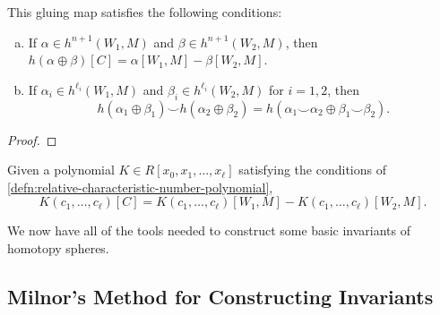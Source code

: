 \begin{proposition}\label{prop:invariant-variation-naturality}
This gluing map satisfies the following conditions:
\begin{enumerate}[(a)]
	\item If $\alpha\in h^{n+1}(W_1, M)$ and $\beta\in h^{n+1}(W_2,M)$, then 
		$h(\alpha\oplus \beta)[C] = \alpha[W_1, M] - \beta[W_2, M]$.
	\item If $\alpha_i\in h^{\ell_i}(W_1,M)$ and $\beta_i \in h^{\ell_i}(W_2,M)$ for $i=1,2$, then 
		\[h(\alpha_1\oplus\beta_1) \smile h(\alpha_2\oplus \beta_2) = h(\alpha_1\smile \alpha_2 \oplus \beta_1\smile \beta_2).\]
\end{enumerate}
\end{proposition}
\begin{proof}
\end{proof}

\begin{corollary}\label{prop:relative-characteristic-number-variation}
	Given a polynomial $K\in R[x_0,x_1,\ldots, x_\ell]$ satisfying the conditions of \cref{defn:relative-characteristic-number-polynomial}, 
	\[
		K(c_1,\ldots, c_\ell)[C] = K(c_1,\ldots, c_\ell)[W_1, M] - K(c_1,\ldots, c_\ell)[W_2, M].
	\]
\end{corollary}

\begin{proposition}\label{prop:signature-variation}
\end{proposition}

We now have all of the tools needed to construct some basic invariants of homotopy spheres.


\subsection{Milnor's Method for Constructing Invariants}

